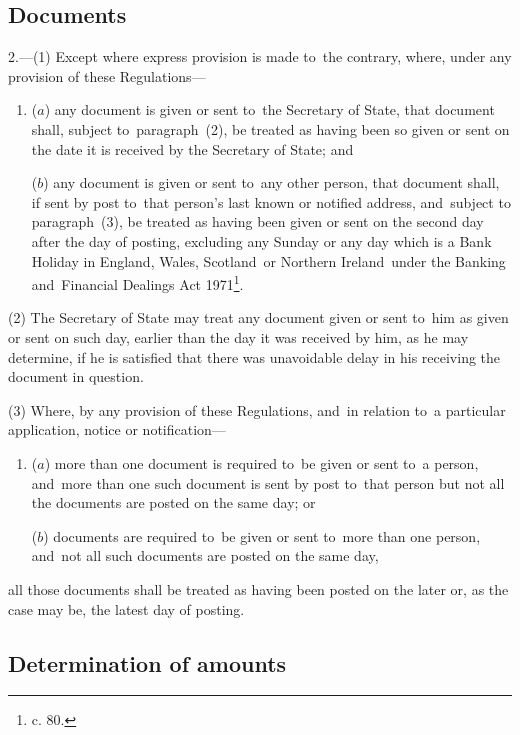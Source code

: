 \documentclass[12pt,a4paper]{article}
\begin{document}
\subsection[2. Documents]{Documents}

2.—(1) Except where express provision is made to~the contrary, where,
under any provision of these Regulations—
\begin{enumerate}\item[]
($a$) any document is given or sent to~the Secretary of State, that document shall,
subject to~paragraph~(2), be treated as having been so given or sent on the date
it is received by the Secretary of State; and

($b$) any document is given or sent to~any other person, that document shall, if
sent by post to~that person’s last known or notified address, and~subject to
paragraph~(3), be treated as having been given or sent on the second day after
the day of posting, excluding any Sunday or any day which is a Bank Holiday in
England, Wales, Scotland~or Northern Ireland~under the Banking and~Financial
Dealings Act 1971\footnote{ c. 80.}.
\end{enumerate}

(2) The Secretary of State may treat any document given or sent to~him as given
or sent on such day, earlier than the day it was received by him, as he may
determine, if he is satisfied that there was unavoidable delay in his receiving
the document in question.

(3) Where, by any provision of these Regulations, and~in relation to~a
particular application, notice or notification—
\begin{enumerate}\item[]
($a$) more than one document is required to~be given or sent to~a person, and~more
than one such document is sent by post to~that person but not all the documents
are posted on the same day; or

($b$) documents are required to~be given or sent to~more than one person, and~not
all such documents are posted on the same day,
\end{enumerate}
all those documents shall be treated as having been posted on the later or, as
the case may be, the latest day of posting.

\subsection[3. Determination of amounts]{Determination of amounts}
\end{document}
